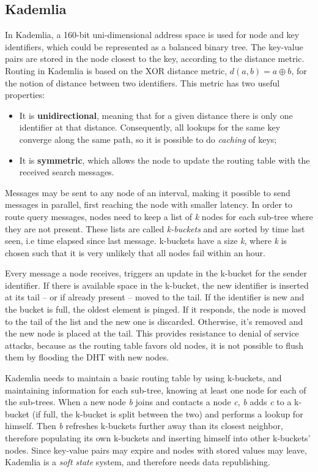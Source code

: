 \subsection{Kademlia} In Kademlia, a 160-bit uni-dimensional address space is used for node and key identifiers, which could be represented as a balanced binary tree.
The key-value pairs are stored in the node closest to the key, according to the distance metric.
Routing in Kademlia is based on the XOR distance metric, \(d(a,b)=a \oplus b\), for the notion of distance between two identifiers.
This metric has two useful properties:
\begin{itemize}
  \item It is \textbf{unidirectional}, meaning that for a given distance there is only one identifier at that distance. Consequently, all lookups for the same key converge along the same path, so it is possible to do \textit{caching} of keys;
	\item It is \textbf{symmetric}, which allows the node to update the routing table with the received search messages.
\end{itemize}
Messages may be sent to any node of an interval, making it possible to send messages in parallel, first reaching the node with smaller latency.
In order to route query messages, nodes need to keep a list of \textit{k} nodes for each sub-tree where they are not present.
These lists are called \textit{k-buckets} and are sorted by time last seen, i.e time elapsed since last message.
k-buckets have a size \textit{k}, where \textit{k} is chosen such that it is very unlikely that all nodes fail within an hour.

Every message a node receives, triggers an update in the k-bucket for the sender identifier. If there is available space in the k-bucket, the new identifier is inserted at its tail – or if already present – moved to the tail.
If the identifier is new and the bucket is full, the oldest element is pinged.
If it responds, the node is moved to the tail of the list and the new one is discarded.
Otherwise, it's removed and the new node is placed at the tail.
This provides resistance to denial of service attacks, because as the routing table favors old nodes, it is not possible to flush them by flooding the DHT with new nodes.

Kademlia needs to maintain a basic routing table by using k-buckets, and maintaining information for each sub-tree, knowing at least one node for each of the sub-trees.
When a new node \textit{b} joins and contacts a node \textit{c}, \textit{b} adds \textit{c} to a k-bucket (if full, the k-bucket is split between the two) and performs a lookup for himself.
Then \textit{b} refreshes k-buckets further away than its closest neighbor, therefore populating its own k-buckets and inserting himself into other k-buckets' nodes.
Since key-value pairs may expire and nodes with stored values may leave, Kademlia is a \textit{soft state} system, and therefore needs data republishing.


